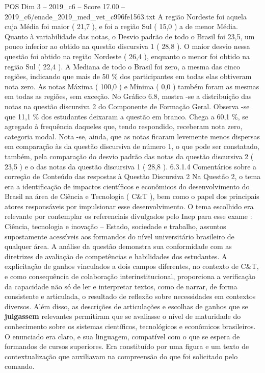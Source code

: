 \begin{textsample}{POS Dim 3 – 2019\_c6 – Score 17.00 – 2019\_c6/enade\_2019\_med\_vet\_c996fe1563.txt}
A região Nordeste foi aquela cuja Média foi maior ( 21,7 ), e foi a região Sul ( 15,0 ) a de menor Média.
Quanto à variabilidade das notas, o Desvio padrão de todo o Brasil foi 23,5, um pouco inferior ao obtido na questão discursiva 1 ( 28,8 ).
O maior desvio nessa questão foi obtido na região Nordeste ( 26,4 ), enquanto o menor foi obtido na região Sul ( 22,4 ).
A Mediana de todo o Brasil foi zero, a mesma das cinco regiões, indicando que mais de 50 \% dos participantes em todas elas obtiveram nota zero.
As notas Máxima ( 100,0 ) e Mínima ( 0,0 ) também foram as mesmas em todas as regiões, sem exceção.
No Gráfico 6.8, mostra -se a distribuição das notas na questão discursiva 2 do Componente de Formação Geral.
Observa -se que 11,1 \% dos estudantes deixaram a questão em branco.
Chega a 60,1 \%, se agregado à frequência daqueles que, tendo respondido, receberam nota zero, categoria modal.
Nota -se, ainda, que as notas ficaram levemente menos dispersas em comparação às da questão discursiva de número 1, o que pode ser constatado, também, pela comparação do desvio padrão das notas da questão discursiva 2 ( 23,5 ) e o das notas da questão discursiva 1 ( 28,8 ). 6.3.1.4 Comentários sobre a correção de Conteúdo das respostas à Questão Discursiva 2 Na Questão 2, o tema era a identificação de impactos científicos e econômicos do desenvolvimento do Brasil na área de Ciência e Tecnologia ( C\&T ), bem como o papel dos principais atores responsáveis por impulsionar esse desenvolvimento.
O tema escolhido era relevante por contemplar os referenciais divulgados pelo Inep para esse exame : Ciência, tecnologia e inovação – Estado, sociedade e trabalho, assuntos supostamente acessíveis aos formandos do nível universitário brasileiro de qualquer área.
A análise da questão demonstra sua conformidade com as diretrizes de avaliação de competências e habilidades dos estudantes.
A explicitação de ganhos vinculados a dois campos diferentes, no contexto de C\&T, e como consequência de colaboração interinstitucional, proporciona a verificação da capacidade não só de ler e interpretar textos, como de narrar, de forma consistente e articulada, o resultado de reflexão sobre necessidades em contextos diversos.
Além disso, as descrições de articulações e escolhas de ganhos que se \textbf{julgassem} relevantes permitiram que se avaliasse o nível de maturidade do conhecimento sobre os sistemas científicos, tecnológicos e econômicos brasileiros.
O enunciado era claro, e sua linguagem, compatível com o que se espera de formandos de cursos superiores.
Era constituído por uma figura e um texto de contextualização que auxiliavam na compreensão do que foi solicitado pelo comando.

\end{textsample}
